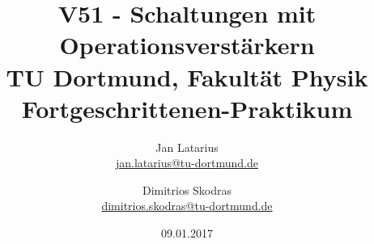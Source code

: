 

\usepackage{xfrac}
\usepackage{xcolor}
\usepackage{setspace}\usepackage{threeparttable}
\usepackage{fancyhdr}
\usepackage{graphicx}
\usepackage[official]{eurosym}
\usepackage{geometry}
\newcommand{\ti}{\text{i}}
\usepackage{siunitx}


\title{V51 - Schaltungen mit Operationsverstärkern\\
\hspace{15cm}%
	\large TU Dortmund, Fakultät Physik\\ 
	\normalsize Fortgeschrittenen-Praktikum}

\author{Jan Latarius\\			%
	{\small \href{jan.latarius@tu-dortmund.de}{jan.latarius@tu-dortmund.de}}	%
	\and						%
	Dimitrios Skodras\\					%
	{\small \href{dimitrios.skodras@tu-dortmund.de}{dimitrios.skodras@tu-dortmund.de}}		%
}
\date{09.01.2017}				%



	

\maketitle					%
\thispagestyle{empty} 				%



\tableofcontents


